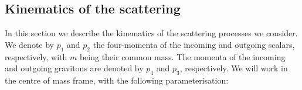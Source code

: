 \documentclass[a4paper,11pt]{article}
\numberwithin{equation}{section}
\begin{document}
\subsection{Kinematics of the scattering}

In this  section we describe the kinematics of the scattering processes we  consider. We denote by  $p_1$ and $p_2$  the four-momenta of the incoming and outgoing scalars, respectively, with  $m$ being their common mass. The momenta of the incoming and outgoing  gravitons are denoted by $p_4$ and $p_3$, respectively. We will  work in the centre of mass frame, with the following parameterisation: 
%
%
%
%
%
%


\end{document}
